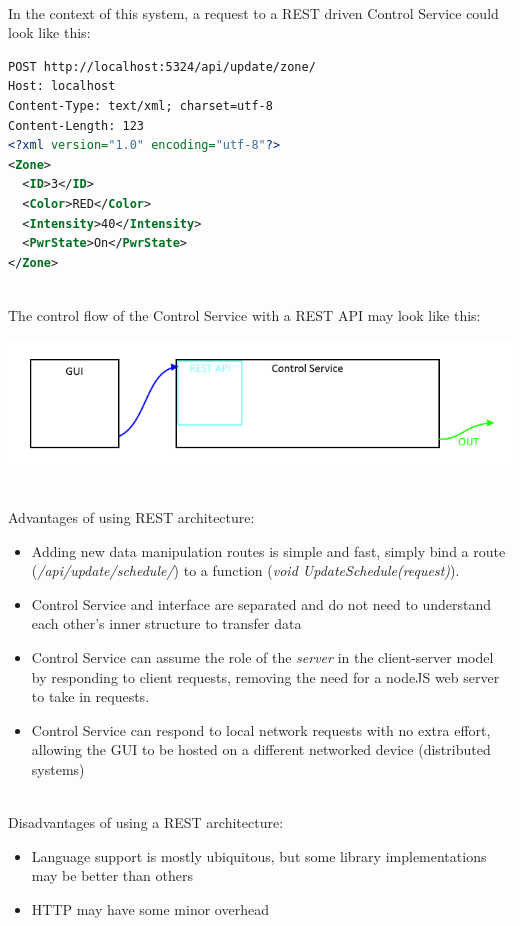 \documentclass[onecolumn, draftclsnofoot,10pt, compsoc]{IEEEtran}
\begin{document}
		\noindent \\In the context of this system, a request to a REST driven Control Service could look like this:
		\begin{lstlisting}[language=XML]
POST http://localhost:5324/api/update/zone/
Host: localhost
Content-Type: text/xml; charset=utf-8
Content-Length: 123
<?xml version="1.0" encoding="utf-8"?>
<Zone>
  <ID>3</ID>
  <Color>RED</Color>
  <Intensity>40</Intensity>
  <PwrState>On</PwrState>
</Zone>
		\end{lstlisting}


		\noindent \\The control flow of the Control Service with a REST API may look like this:

		\includegraphics[width=\linewidth]{RESTDiag.png}

		\noindent \\Advantages of using REST architecture:
		\begin{itemize}
			\item Adding new data manipulation routes is simple and fast, simply bind a route (\textit{/api/update/schedule/}) to a function (\textit{void UpdateSchedule(request)}).
			\item Control Service and interface are separated and do not need to understand each other's inner structure to transfer data
			\item Control Service can assume the role of the \textit{server} in the client-server model by responding to client requests, removing the need for a nodeJS web server to take in requests.
			\item Control Service can respond to local network requests with no extra effort, allowing the GUI to be hosted on a different networked device (distributed systems)
		\end{itemize}

		\noindent \\Disadvantages of using a REST architecture:
		\begin{itemize}
			\item Language support is mostly ubiquitous, but some library implementations may be better than others
			\item HTTP may have some minor overhead
		\end{itemize}
\end{document}
